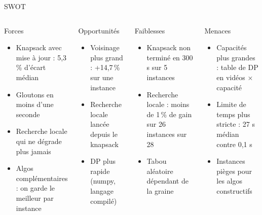 \documentclass[aspectratio=169,11pt]{beamer}
\begin{document}
\begin{frame}{SWOT}
  \small
  \begin{columns}[T]
    \begin{block}{Forces}
      \begin{itemize}
        \item Knapsack avec mise à jour : 5,3\,\% d'écart médian
        \item Gloutons en moins d'une seconde
        \item Recherche locale qui ne dégrade plus jamais
        \item Algos complémentaires : on garde le meilleur par instance
      \end{itemize}
    \end{block}
    \begin{block}{Opportunités}
      \begin{itemize}
        \item Voisinage plus grand : +14,7\,\% sur une instance
        \item Recherche locale lancée depuis le knapsack
        \item DP plus rapide (numpy, langage compilé)
      \end{itemize}
    \end{block}
    \begin{block}{Faiblesses}
      \begin{itemize}
        \item Knapsack non terminé en 300 s sur 5 instances
        \item Recherche locale : moins de 1\,\% de gain sur 26 instances sur 28
        \item Tabou aléatoire dépendant de la graine
      \end{itemize}
    \end{block}
    \begin{block}{Menaces}
      \begin{itemize}
        \item Capacités plus grandes : table de DP en vidéos $\times$ capacité
        \item Limite de temps plus stricte : 27 s médian contre 0,1 s
        \item Instances pièges pour les algos constructifs
      \end{itemize}
    \end{block}
  \end{columns}
\end{frame}
\end{document}
